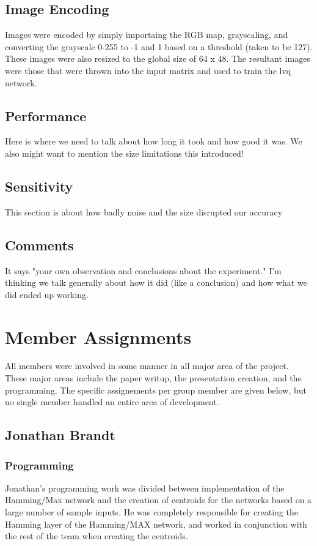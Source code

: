 \documentclass{article}
\begin{document}
\subsection{Image Encoding}
Images were encoded by simply importaing the RGB map, grayscaling, and converting the grayscale 0-255 to -1 and 1 based on a threshold (taken to be 127). These images were also resized to the global size of 64 x 48. The resultant images were those that were thrown into the input matrix and used to train the lvq network.

\subsection{Performance}
Here is where we need to talk about how long it took and how good it was. We
also might want to mention the size limitations this introduced!

\subsection{Sensitivity}
This section is about how badly noise and the size disrupted our accuracy

\subsection{Comments}
It says "your own observation and conclusions about the experiment."
I'm thinking we talk generally about how it did (like a conclusion) and how
what we did ended up working.

 
\section{Member Assignments}
All members were involved in some manner in all major area of the project. These
major areas include the paper writup, the presentation creation, and the 
programming. The specific assignements per group member are given below, but no
single member handled an entire area of development.
\subsection{Jonathan Brandt}
\subsubsection{Programming}
Jonathan's programming work was divided between implementation of the 
Hamming/Max network and the creation of centroids for the networks based on a
large number of sample inputs. He was completely responsible for creating the Hamming layer of the Hamming/MAX network, and worked in conjunction with the rest of the team when creating the centroids. 
\end{document}
